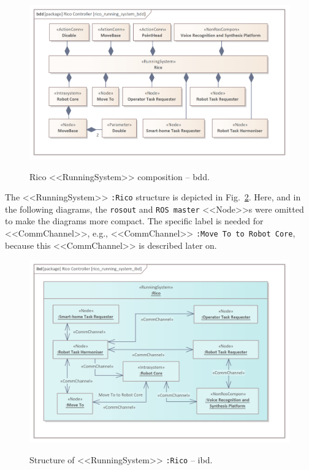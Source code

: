 \documentclass[11pt,oneside,a4paper]{article}
\begin{document}
	\begin{figure}[H]
		\centering
		\begin{center}
			{\includegraphics[scale=0.9]{img/rico_pkg/rico_running_system_bdd.png}}
		\end{center}
		\caption{Rico <<RunningSystem>> composition -- bdd.}
		\label{fig:rico_running_system_bdd}
	\end{figure}
	
	The <<RunningSystem>> \texttt{:Rico} structure is depicted in Fig.~\ref{fig:rico_running_system_ibd}. Here, and in the following diagrams, the \texttt{rosout} and \texttt{ROS master} <<Node>>s were omitted to make the diagrams more compact. The specific label is needed for <<CommChannel>>, e.g., <<CommChannel>> \texttt{:Move To to Robot Core}, because this <<CommChannel>> is described later on.
	
	\begin{figure}[H]
		\centering
		\begin{center}
			{\includegraphics[scale=1.0]{img/rico_pkg/rico_running_system_ibd.png}}
		\end{center}
		\caption{Structure of <<RunningSystem>> \texttt{:Rico} -- ibd.} 
		\label{fig:rico_running_system_ibd}
	\end{figure}
\end{document}
